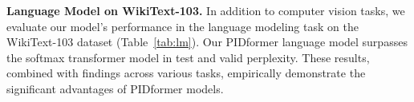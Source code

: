 \textbf{Language Model on WikiText-103.}
In addition to computer vision tasks, we evaluate our model's performance in the language modeling task on the WikiText-103 dataset (Table~\ref{tab:lm}). Our PIDformer language model surpasses the softmax transformer model \cite{xiong2021nystromformer} in test and valid perplexity. These results, combined with findings across various tasks, empirically demonstrate the significant advantages of PIDformer models.
\begin{table}[t!]
\vspace{-4mm}
\footnotesize
    \caption{\small Test and valid perplexity (Test PPL and Valid PPL) on WikiText-103 of PIDformer compared to the softmax transformer.%
    }
    \begin{center}
    \end{center}
\label{tab:lm}
\end{table}

